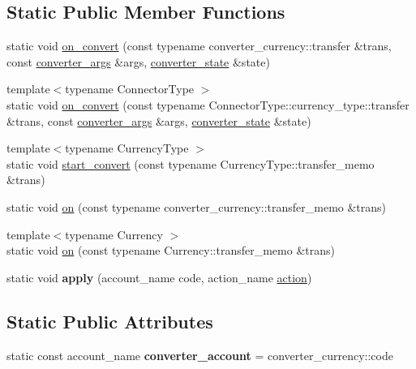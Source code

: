 \subsection*{Static Public Member Functions}
\begin{DoxyCompactItemize}
\item 
static void \mbox{\hyperlink{classbancor_1_1converter__contract_a606723604418ba5f0432493ba2ffd818}{on\+\_\+convert}} (const typename converter\+\_\+currency\+::transfer \&trans, const \mbox{\hyperlink{structbancor_1_1converter__contract_1_1converter__args}{converter\+\_\+args}} \&args, \mbox{\hyperlink{structbancor_1_1converter__contract_1_1converter__state}{converter\+\_\+state}} \&state)
\item 
{\footnotesize template$<$typename Connector\+Type $>$ }\\static void \mbox{\hyperlink{classbancor_1_1converter__contract_af868857d116887b596094fec4a4cb1e3}{on\+\_\+convert}} (const typename Connector\+Type\+::currency\+\_\+type\+::transfer \&trans, const \mbox{\hyperlink{structbancor_1_1converter__contract_1_1converter__args}{converter\+\_\+args}} \&args, \mbox{\hyperlink{structbancor_1_1converter__contract_1_1converter__state}{converter\+\_\+state}} \&state)
\item 
{\footnotesize template$<$typename Currency\+Type $>$ }\\static void \mbox{\hyperlink{classbancor_1_1converter__contract_ab04abf8e1d02393ddbc9b09b5b5a5be1}{start\+\_\+convert}} (const typename Currency\+Type\+::transfer\+\_\+memo \&trans)
\item 
static void \mbox{\hyperlink{classbancor_1_1converter__contract_a9042eadac31dfc5a4133cfbecaefb66e}{on}} (const typename converter\+\_\+currency\+::transfer\+\_\+memo \&trans)
\item 
{\footnotesize template$<$typename Currency $>$ }\\static void \mbox{\hyperlink{classbancor_1_1converter__contract_a05d78a86731dfec1c38f8997d3392f79}{on}} (const typename Currency\+::transfer\+\_\+memo \&trans)
\item 
\mbox{\label{classbancor_1_1converter__contract_a77bbe12a77d7b973402f3d99273f529c}} 
static void {\bfseries apply} (account\+\_\+name code, action\+\_\+name \mbox{\hyperlink{structaction}{action}})
\end{DoxyCompactItemize}
\subsection*{Static Public Attributes}
\begin{DoxyCompactItemize}
\item 
\mbox{\label{classbancor_1_1converter__contract_a32e3133aa1b0937ef75191348bc966b3}} 
static const account\+\_\+name {\bfseries converter\+\_\+account} = converter\+\_\+currency\+::code
\end{DoxyCompactItemize}


